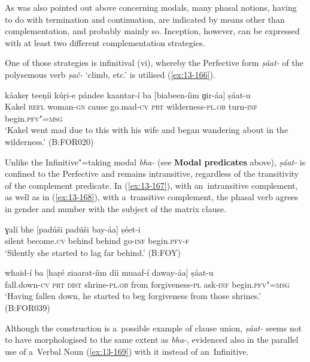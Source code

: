  As was also pointed out above concerning modals, many phasal notions, having to do with termination and continuation, are indicated by means other than complementation, and probably mainly so. Inception, however, can be expressed with at least two different complementation strategies.


One of those strategies is infinitival (vi), whereby the Perfective form \textit{ṣáat-} of the polysemous verb \textit{ṣač-} `climb, etc.' is utilised (\ref{ex:13-166}). 

\begin{exe}
\ex
\label{ex:13-166}
\gll káakeṛ teeṇíi kúṛi-e pándee kaantar-í ba  [biabeen-íim ɡir-áa] ṣáat-u \\
Kakel \textsc{ refl} woman-\textsc{gn} cause go.mad-\textsc{cv} \textsc{prt}  wilderness-\textsc{pl.ob} turn-\textsc{inf} begin.\textsc{pfv"=msg} \\
\glt `Kakel went mad due to this with his wife and began wandering about in the wilderness.' (B:FOR020) 
\end{exe}

Unlike the Infinitive"=taking modal \textit{bha-} (see \textbf{Modal predicates} above), \textit{ṣáat-} is confined to the Perfective and remains intransitive, regardless of the transitivity of the complement predicate. In (\ref{ex:13-167}), with an~intransitive complement, as well as in (\ref{ex:13-168}), with a~transitive complement, the phasal verb agrees in gender and number with the subject of the matrix clause.

\begin{exe}
\ex
\label{ex:13-167}
\gll ɣalí bhe [padúši padúši bay-áa] ṣéet-i  \\
silent become.\textsc{cv} behind behind go-\textsc{inf} begin.\textsc{pfv-f} \\
\glt `Silently she started to lag far behind.' (B:FOY)

\ex
\label{ex:13-168}
\gll whaid-í ba [haṛé ziaarat-íim díi  muaaf-í daway-áa] ṣáat-u \\
fall.down-\textsc{cv} \textsc{prt} \textsc{dist} shrine-\textsc{pl.ob} from forgiveness-\textsc{pl} ask-\textsc{inf} begin.\textsc{pfv"=msg}  \\
\glt `Having fallen down, he started to beg forgiveness from those shrines.' (B:FOR039) 
\end{exe}

Although the construction is a~possible example of clause union, \textit{ṣáat-} seems not to have morphologised to the same extent as \textit{bha-}, evidenced also in the parallel use of a~Verbal Noun (\ref{ex:13-169}) with it instead of an~Infinitive. 

